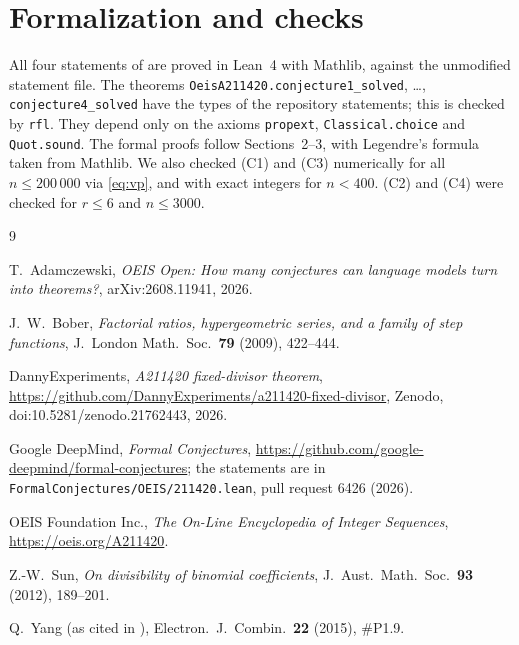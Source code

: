 \documentclass[11pt]{amsart}
\theoremstyle{remark}
\newcommand{\lean}[1]{\texttt{#1}}
\begin{document}
\section{Formalization and checks}

All four statements of \cite{FC} are proved in Lean~4 with Mathlib, against the unmodified statement file.
The theorems \lean{OeisA211420.conjecture1\_solved}, \dots, \lean{conjecture4\_solved} have the types of the repository statements; this is checked by \lean{rfl}.
They depend only on the axioms \lean{propext}, \lean{Classical.choice} and \lean{Quot.sound}.
The formal proofs follow Sections~2--3, with Legendre's formula taken from Mathlib.
We also checked (C1) and (C3) numerically for all $n\le200\,000$ via \eqref{eq:vp}, and with exact integers for $n<400$.
(C2) and (C4) were checked for $r\le6$ and $n\le3000$.

\begin{thebibliography}{9}

T.~Adamczewski, \emph{OEIS Open: How many conjectures can language models turn into theorems?}, arXiv:2608.11941, 2026.

J.~W.~Bober, \emph{Factorial ratios, hypergeometric series, and a family of step functions}, J.\ London Math.\ Soc.\ \textbf{79} (2009), 422--444.

DannyExperiments, \emph{A211420 fixed-divisor theorem}, \url{https://github.com/DannyExperiments/a211420-fixed-divisor}, Zenodo, doi:10.5281/zenodo.21762443, 2026.

Google DeepMind, \emph{Formal Conjectures}, \url{https://github.com/google-deepmind/formal-conjectures}; the statements are in \texttt{FormalConjectures/OEIS/211420.lean}, pull request 6426 (2026).

OEIS Foundation Inc., \emph{The On-Line Encyclopedia of Integer Sequences}, \url{https://oeis.org/A211420}.

Z.-W.~Sun, \emph{On divisibility of binomial coefficients}, J.\ Aust.\ Math.\ Soc.\ \textbf{93} (2012), 189--201.

Q.~Yang (as cited in \cite{Danny}), Electron.\ J.\ Combin.\ \textbf{22} (2015), \#P1.9.

\end{thebibliography}
\end{document}
